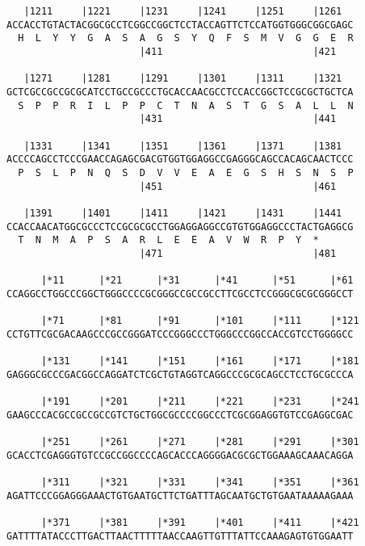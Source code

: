 \documentclass{article}
\begin{document}
\begin{Verbatim}
   |1211     |1221     |1231     |1241     |1251     |1261  
ACCACCTGTACTACGGCGCCTCGGCCGGCTCCTACCAGTTCTCCATGGTGGGCGGCGAGC
  H  L  Y  Y  G  A  S  A  G  S  Y  Q  F  S  M  V  G  G  E  R
                       |411                          |421   
  
   |1271     |1281     |1291     |1301     |1311     |1321  
GCTCGCCGCCGCGCATCCTGCCGCCCTGCACCAACGCCTCCACCGGCTCCGCGCTGCTCA
  S  P  P  R  I  L  P  P  C  T  N  A  S  T  G  S  A  L  L  N
                       |431                          |441   
  
   |1331     |1341     |1351     |1361     |1371     |1381  
ACCCCAGCCTCCCGAACCAGAGCGACGTGGTGGAGGCCGAGGGCAGCCACAGCAACTCCC
  P  S  L  P  N  Q  S  D  V  V  E  A  E  G  S  H  S  N  S  P
                       |451                          |461   
  
   |1391     |1401     |1411     |1421     |1431     |1441  
CCACCAACATGGCGCCCTCCGCGCGCCTGGAGGAGGCCGTGTGGAGGCCCTACTGAGGCG
  T  N  M  A  P  S  A  R  L  E  E  A  V  W  R  P  Y  *   
                       |471                          |481   
  
      |*11      |*21      |*31      |*41      |*51      |*61
CCAGGCCTGGCCCGGCTGGGCCCCGCGGGCCGCCGCCTTCGCCTCCGGGCGCGCGGGCCT
                                                            
      |*71      |*81      |*91      |*101     |*111     |*121
CCTGTTCGCGACAAGCCCGCCGGGATCCCGGGCCCTGGGCCCGGCCACCGTCCTGGGGCC
                                                            
      |*131     |*141     |*151     |*161     |*171     |*181
GAGGGCGCCCGACGGCCAGGATCTCGCTGTAGGTCAGGCCCGCGCAGCCTCCTGCGCCCA
                                                            
      |*191     |*201     |*211     |*221     |*231     |*241
GAAGCCCACGCCGCCGCCGTCTGCTGGCGCCCCGGCCCTCGCGGAGGTGTCCGAGGCGAC
                                                            
      |*251     |*261     |*271     |*281     |*291     |*301
GCACCTCGAGGGTGTCCGCCGGCCCCAGCACCCAGGGGACGCGCTGGAAAGCAAACAGGA
                                                            
      |*311     |*321     |*331     |*341     |*351     |*361
AGATTCCCGGAGGGAAACTGTGAATGCTTCTGATTTAGCAATGCTGTGAATAAAAAGAAA
                                                            
      |*371     |*381     |*391     |*401     |*411     |*421
GATTTTATACCCTTGACTTAACTTTTTAACCAAGTTGTTTATTCCAAAGAGTGTGGAATT
                                                            

\end{Verbatim}
\end{document}
